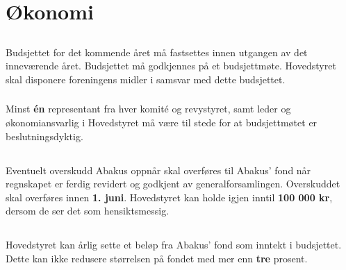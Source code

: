 \section{Økonomi}
\subsection{}
Budsjettet for det kommende året må fastsettes innen utgangen av det inneværende året. 
Budsjettet må godkjennes på et budsjettmøte. Hovedstyret skal disponere foreningens midler i samsvar med dette budsjettet.

\subsubsection{}
Minst \textbf{én} representant fra hver komité og revystyret, samt leder og økonomiansvarlig i 
Hovedstyret må være til stede for at budsjettmøtet er beslutningsdyktig.

\subsection{}
Eventuelt overskudd Abakus oppnår skal overføres til Abakus’ fond når regnskapet er ferdig revidert og 
godkjent av generalforsamlingen. Overskuddet skal overføres innen \textbf{1. juni}. 
Hovedstyret kan holde igjen inntil \textbf{100 000 kr}, dersom de ser det som hensiktsmessig.

\subsection{}
Hovedstyret kan årlig sette et beløp fra Abakus’ fond som inntekt i budsjettet. Dette kan ikke 
redusere størrelsen på fondet med mer enn \textbf{tre} prosent.
